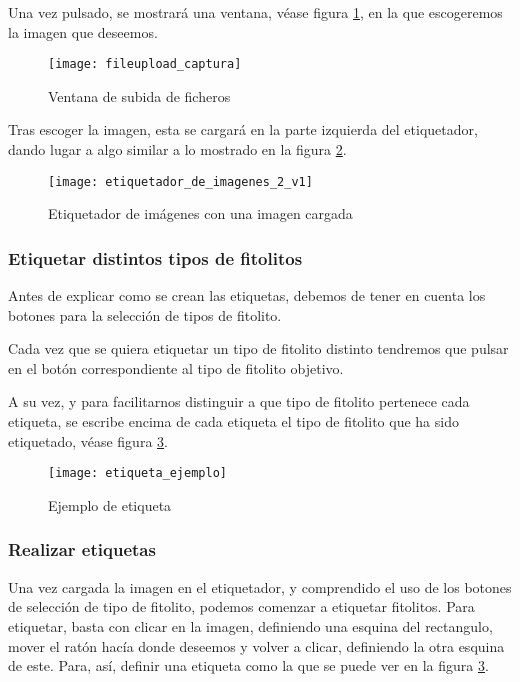 Una vez  pulsado, se mostrará una ventana, véase figura \ref{fig:E.4.4}, en la que escogeremos la imagen que deseemos.

\begin{figure}[h]
\centering
\texttt{[image: fileupload\_captura]}
\caption{Ventana de subida de ficheros}
\label{fig:E.4.4}
\end{figure}

Tras escoger la imagen, esta se cargará en la parte izquierda del etiquetador, dando lugar a algo similar a lo mostrado en la figura \ref{fig:E.4.5}.

\begin{figure}[h]
\centering
\texttt{[image: etiquetador\_de\_imagenes\_2\_v1]}
\caption{Etiquetador de imágenes con una imagen cargada}
\label{fig:E.4.5}
\end{figure}

\subsubsection{Etiquetar distintos tipos de fitolitos}
Antes de explicar como se crean las etiquetas, debemos de tener en cuenta los botones para la selección de tipos de fitolito.

Cada vez que se quiera etiquetar un tipo de fitolito distinto tendremos que pulsar en el botón correspondiente al tipo de fitolito objetivo.

A su vez, y para facilitarnos distinguir a que tipo de fitolito pertenece cada etiqueta, se escribe encima de cada etiqueta el tipo de fitolito que ha sido etiquetado, véase figura \ref{fig:E.4.6}.

\begin{figure}[h]
\centering
\texttt{[image: etiqueta\_ejemplo]}
\caption{Ejemplo de etiqueta}
\label{fig:E.4.6}
\end{figure}

\subsubsection{Realizar etiquetas}

Una vez cargada la imagen en el etiquetador, y comprendido el uso de los botones de selección de tipo de fitolito, podemos comenzar a  etiquetar fitolitos. Para etiquetar, basta con clicar en la imagen, definiendo una esquina del rectangulo, mover el ratón hacía donde deseemos y volver a clicar, definiendo la otra esquina de este. Para, así, definir una etiqueta como la que se puede ver en la figura \ref{fig:E.4.6}.

